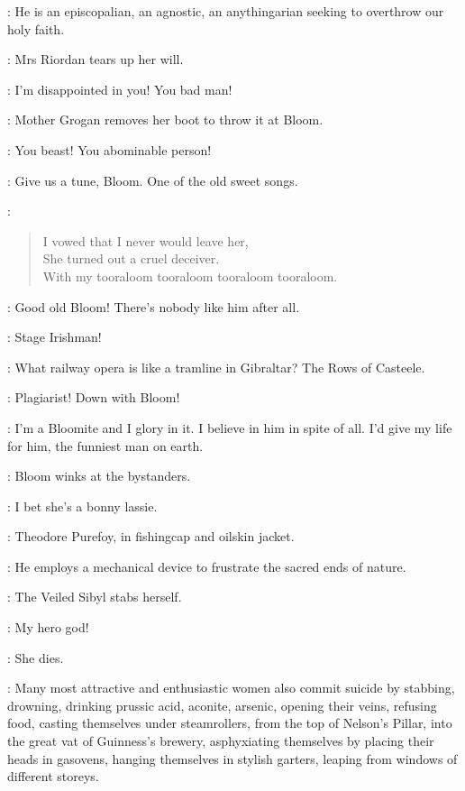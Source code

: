 \FatherFarley[1]:
He is an episcopalian, an agnostic, an anythingarian
seeking to overthrow our holy faith.

:
Mrs Riordan tears up her will.

\MrsRiordan:
I'm disappointed in you! You bad man!

:
Mother Grogan removes her boot to throw it at Bloom.

\MotherGrogan:
You beast!
You abominable person!

\NoseyFlynn[2]:
Give us a tune, Bloom.
One of the old sweet songs.

\Bloom:
\begin{verse}
    I vowed that I never would leave her,\\
    She turned out a cruel deceiver.\\
    With my tooraloom tooraloom tooraloom tooraloom.
\end{verse}

\HoppyHolohan[1]:
Good old Bloom!
There's nobody like him after all.

\PaddyLeonard[2]:
Stage Irishman!

\Bloom:
What railway opera is like a tramline in Gibraltar?
The Rows of Casteele.


\Lenehan[1]:
Plagiarist!
Down with Bloom!

\VeiledSibyl[2]:
I'm a Bloomite and I glory in it.
I believe in him in spite of all.
I'd give my life for him, the funniest man on earth.

:
Bloom winks at the bystanders.

\Bloom:
I bet she's a bonny lassie.

:
Theodore Purefoy, in fishingcap and oilskin jacket.

\TheodorePurefoy:
He employs a mechanical device to frustrate the sacred ends of nature.

:
The Veiled Sibyl stabs herself.

\VeiledSibyl:
My hero god!

:
She dies.

:
Many most attractive and enthusiastic women also commit suicide
by stabbing, drowning, drinking prussic acid, aconite, arsenic,
opening their veins, refusing food, casting themselves under steamrollers,
from the top of Nelson's Pillar, into the great vat of Guinness's brewery,
asphyxiating themselves by placing their heads in gasovens,
hanging themselves in stylish garters,
leaping from windows of different storeys.

